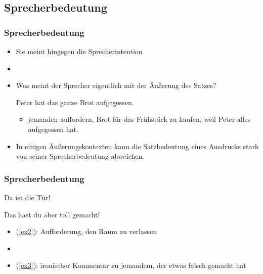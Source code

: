 %
\subsection{Sprecherbedeutung}
%

\begin{frame}
\frametitle{Sprecherbedeutung}

\begin{itemize}
	\item Sie meint hingegen die Sprecherintention
	\item[]
	\item Was meint der Sprecher eigentlich mit der Äußerung des Satzes?

	\ea \label{ex1b}Peter hat das ganze Brot aufgegessen.
	\z

\pause 

	\begin{itemize}
		\item jemanden auffordern, Brot für das Frühstück zu kaufen, weil Peter alles aufgegessen hat.
	\end{itemize}
	
	\item In einigen Äußerungskontexten kann die Satzbedeutung eines Ausdrucks stark von seiner Sprecherbedeutung abweichen.
\end{itemize}

\end{frame}



\begin{frame}
\frametitle{Sprecherbedeutung}


	\ea \label{ex2} Da ist die Tür!
	\z
	
	\ea \label{ex3}Das hast du aber toll gemacht!
	\z

\pause 
	
	\begin{itemize}
		\item (\ref{ex2}): Aufforderung, den Raum zu verlassen
		\item[]
		\item (\ref{ex3}): ironischer Kommentar zu jemandem, der etwas falsch gemacht hat
		
	\end{itemize}
	
\end{frame}


